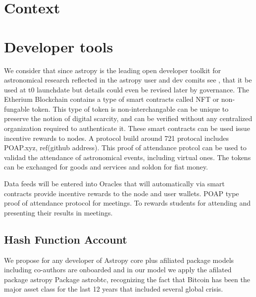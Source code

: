 \documentclass[final,5p,times,twocolumn,authoryear]{elsarticle}
\begin{document}
\section{Context}
\label{section:context}
%


\section{Developer tools}
\label{section:Eth721}
%
We consider that since astropy is the leading open developer toolkit for astronomical research reflected in the astropy  user and dev comits see \cite{ 2020ASPC..522..491T}, that it be used at t0 launchdate but details could even be revised later by governance.  The Etherium Blockchain contains a type of smart contracts called NFT or non-fungable token.  This type of token is non-interchangable can be unique to preserve the notion of digital scarcity, and can be verified without any centralized organization required to authenticate it. These smart contracts can be used issue incentive rewards to nodes. A protocol build around 721 protocal includes POAP.xyz, ref(github address). This proof of attendance protcol can be used to validad the attendance of astronomical events, including virtual ones. The tokens can be exchanged for goods and services and soldon for fiat money.  


Data feeds will be entered into Oracles that will automatically via smart contracts provide incentive rewards to the node and user wallets.
%
POAP type proof of attendance protocol for meetings. To rewards students for attending and presenting their results in meetings.
%
\subsection{Hash Function Account}
We propose for any developer of Astropy core plus afiliated package models including co-authors are onboarded and in our model we apply the afilated package astropy Package astrobtc, recognizing the fact that Bitcoin has been the major asset class for the last 12 years that included several global crisis. 
%
\end{document}
